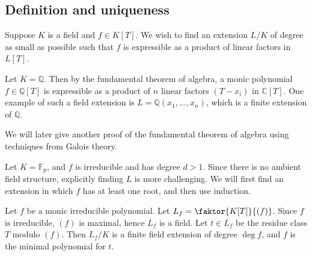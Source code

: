 \subsection{Definition and uniqueness}
Suppose \( K \) is a field and \( f \in K[T] \).
We wish to find an extension \( L / K \) of degree as small as possible such that \( f \) is expressible as a product of linear factors in \( L[T] \).
\begin{example}
	Let \( K = \mathbb Q \).
	Then by the fundamental theorem of algebra, a monic polynomial \( f \in \mathbb Q[T] \) is expressible as a product of \( n \) linear factors \( (T - x_i) \) in \( \mathbb C[T] \).
	One example of such a field extension is \( L = \mathbb Q(x_1, \dots, x_n) \), which is a finite extension of \( \mathbb Q \).
\end{example}
We will later give another proof of the fundamental theorem of algebra using techniques from Galois theory.
\begin{example}
	Let \( K = \mathbb F_p \), and \( f \) is irreducible and has degree \( d > 1 \).
	Since there is no ambient field structure, explicitly finding \( L \) is more challenging.
	We will first find an extension in which \( f \) has at least one root, and then use induction.
\end{example}
\begin{theorem}
	Let \( f \) be a monic irreducible polynomial.
	Let \( L_f = \faktor{K[T]}{(f)} \).
	Since \( f \) is irreducible, \( (f) \) is maximal, hence \( L_f \) is a field.
	Let \( t \in L_f \) be the residue class \( T \) modulo \( (f) \).
	Then \( L_f/K \) is a finite field extension of degree \( \deg f \), and \( f \) is the minimal polynomial for \( t \).
\end{theorem}

